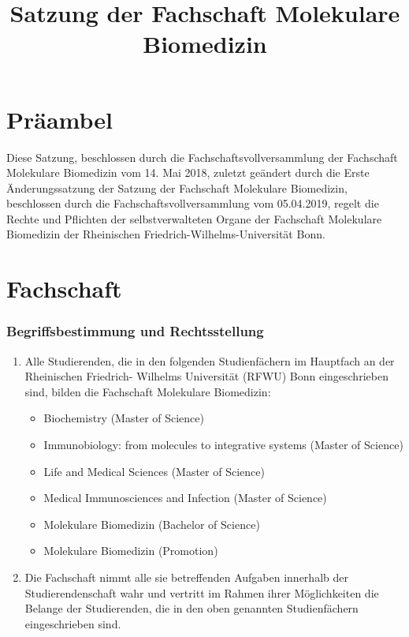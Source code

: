 \documentclass{article}
\title{Satzung der Fachschaft Molekulare Biomedizin}
\date{}
\providecommand{\tightlist}{\setlength{\itemsep}{0pt}\setlength{\parskip}{0pt}}
\begin{document}
\thispagestyle{empty} \tableofcontents \thispagestyle{empty}
\pagebreak
\clearpage
{}
\maketitle

\part*{Präambel}\label{pruxe4ambel}
Diese Satzung, beschlossen durch die Fachschaftsvollversammlung der Fachschaft Molekulare Biomedizin vom 14. Mai 2018, zuletzt geändert durch die Erste Änderungssatzung der Satzung der Fachschaft Molekulare Biomedizin, beschlossen durch die Fachschaftsvollversammlung vom 05.04.2019, regelt die Rechte und Pflichten der selbstverwalteten Organe der Fachschaft Molekulare Biomedizin der Rheinischen Friedrich-Wilhelms-Universität Bonn.

\part{Fachschaft}\label{a.-fachschaft}

\section{Begriffsbestimmung und Rechtsstellung}\label{begriffsbestimmung-und-rechtsstellung}

\begin{enumerate}[(1)]
	\item Alle Studierenden, die in den folgenden Studienfächern im Hauptfach an der Rheinischen Friedrich- Wilhelms Universität (RFWU) Bonn eingeschrieben sind, bilden die Fachschaft Molekulare Biomedizin:
	\begin{itemize}
		\tightlist
		\item Biochemistry (Master of Science)
		\item Immunobiology: from molecules to integrative systems (Master of Science)
		\item Life and Medical Sciences (Master of Science)
		\item Medical Immunosciences and Infection (Master of Science)
		\item Molekulare Biomedizin (Bachelor of Science)
		\item Molekulare Biomedizin (Promotion)
	\end{itemize}
	\item Die Fachschaft nimmt alle sie betreffenden Aufgaben innerhalb der Studierendenschaft wahr und vertritt im Rahmen ihrer Möglichkeiten die Belange der Studierenden, die in den oben genannten Studienfächern eingeschrieben sind.
\end{enumerate}
\end{document}
